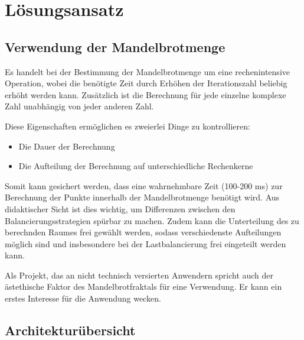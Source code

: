 \section{Lösungsansatz}

\subsection{Verwendung der Mandelbrotmenge}

Es handelt bei der Bestimmung der Mandelbrotmenge um eine rechenintensive Operation, wobei
die benötigte Zeit durch Erhöhen der Iterationszahl beliebig erhöht werden kann.
Zusätzlich ist die Berechnung für jede einzelne komplexe Zahl unabhängig von
jeder anderen Zahl.

Diese Eigenschaften ermöglichen es zweierlei Dinge zu kontrollieren:
\begin{itemize}
	\item Die Dauer der Berechnung
	\item Die Aufteilung der Berechnung auf unterschiedliche Rechenkerne
\end{itemize}

Somit kann gesichert werden, dass eine wahrnehmbare Zeit (100-200 ms) zur Berechnung der Punkte innerhalb
der Mandelbrotmenge benötigt wird.
Aus didaktischer Sicht ist dies wichtig, um Differenzen zwischen den Balancierungsstrategien spürbar zu machen.
Zudem kann die Unterteilung des zu berechnden Raumes frei gewählt werden, sodass
verschiedenste Aufteilungen möglich sind und insbesondere bei der Lastbalancierung frei eingeteilt werden kann.

Als Projekt, das an nicht technisch versierten Anwendern spricht auch der ästethische
Faktor des Mandelbrotfraktals für eine Verwendung.
Er kann ein erstes Interesse für die Anwendung wecken.

\subsection{Architekturübersicht}

